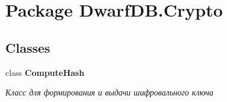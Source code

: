 \hypertarget{namespace_dwarf_d_b_1_1_crypto}{
\section{Package DwarfDB.Crypto}
\label{namespace_dwarf_d_b_1_1_crypto}
}
\subsection*{Classes}
\begin{DoxyCompactItemize}
\item 
class {\bfseries ComputeHash}
\begin{DoxyCompactList}\small\item\em Класс для формирования и выдачи шифровального ключа \item\end{DoxyCompactList}\end{DoxyCompactItemize}
